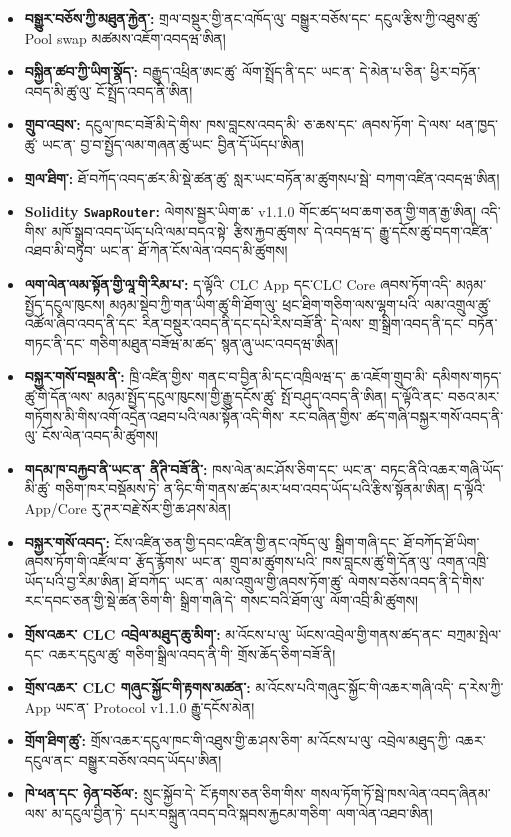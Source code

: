 \documentclass[11pt]{article}
\begin{document}
\begin{itemize}[leftmargin=*]
\item \textbf{བསྒྱུར་བཅོས་ཀྱི་མཐུན་རྐྱེན་:} གྲལ་བསྡུར་གྱི་ནང་འཁོད་ལུ་ བསྒྱུར་བཅོས་དང་ དངུལ་རྩིས་ཀྱི་འཐུས་ཚུ་ Pool swap མཚམས་འཇོག་འབདཝ་ཨིན།
\item \textbf{བསྐྱིན་ཚབ་ཀྱི་ཡིག་སྣོད་:} བརྒྱུད་འཕྲིན་ཨང་ཚུ་ ལོག་སྤྲོད་ནི་དང་ ཡང་ན་ དེ་མེན་པ་ཅིན་ ཕྱིར་བཏོན་འབད་མི་ཚུ་ལུ་ ངོ་སྤྲོད་འབད་ནི་ཨིན།
\item \textbf{གྲུབ་འབྲས་:} དངུལ་ཁང་བཟོ་མི་དེ་གིས་ ཁས་བླངས་འབད་མི་ ཅ་ཆས་དང་ ཞབས་ཏོག་ དེ་ལས་ ཕན་ཁྱད་ཚུ་ ཡང་ན་ བྱ་བ་སྤྱོད་ལམ་གཞན་ཚུ་ཡང་ བྱིན་དོ་ཡོདཔ་ཨིན།
\item \textbf{གྲལ་ཐིག་:} ཐོ་བཀོད་འབད་ཚར་མི་སྡེ་ཚན་ཚུ་ སླར་ཡང་བཏོན་མ་ཚུགསཔ་སྦེ་ བཀག་འཛིན་འབདཝ་ཨིན།
\item \textbf{Solidity \texttt{SwapRouter}:} ལེགས་སྦྱར་ཡིག་ཆ་ v1.1.0 གོང་ཚད་ཕབ་ཆག་ཅན་གྱི་གན་རྒྱ་ཨིན། འདི་གིས་ མཁོ་སྒྲུབ་འབད་ཡོད་པའི་ལམ་བདའ་སྟེ་ རྩིས་རྐྱབ་ཚུགས་ དེ་འབདཝ་ད་ རྒྱུ་དངོས་ཚུ་བདག་འཛིན་འཐབ་མི་བཏུབ་ ཡང་ན་ ཐོ་ཀེན་ངོས་ལེན་འབད་མི་ཚུགས།
\item \textbf{ལག་ལེན་ལམ་སྟོན་གྱི་ལཱ་གི་རིམ་པ་:} ད་ལྟོའི་ CLC App དང་CLC Core ཞབས་ཏོག་འདི་ མཉམ་སྤྱོད་དངུལ་ཁུངས། མཉམ་སྡེབ་ཀྱི་གན་ཡིག་ཚུ་གི་ཐོག་ལུ་ ཕྲང་ཐིག་གཅིག་ལས་ལྷག་པའི་ ལམ་འགྲུལ་ཚུ་འཚོལ་ཞིབ་འབད་ནི་དང་ རིན་བསྡུར་འབད་ནི་དང་དཔེ་རིས་བཟོ་ནི་ དེ་ལས་ གྲ་སྒྲིག་འབད་ནི་དང་ བཏོན་གཏང་ནི་དང་ གཅིག་མཐུན་བཟོཝ་མ་ཚད་ སྙན་ཞུ་ཡང་འབདཝ་ཨིན།
\item \textbf{བསྐྱར་གསོ་བསྡམ་ནི་:} ཁྲི་འཛིན་གྱིས་ གནང་བ་བྱིན་མི་དང་འཁྲིལཝ་ད་ ཆ་འཇོག་གྲུབ་མི་ དམིགས་གཏད་ཚུ་གི་དོན་ལས་ མཉམ་སྤྱོད་དངུལ་ཁུངས།་གྱི་རྒྱུ་དངོས་ཚུ་ སྤོ་བཤུད་འབད་ནི་ཨིན། ད་ལྟོའི་ནང་ བཅའ་མར་གཏོགས་མི་གིས་འགོ་འདྲེན་འཐབ་པའི་ལམ་སྟོན་འདི་གིས་ རང་བཞིན་གྱིས་ ཚད་གཞི་བསྐྱར་གསོ་འབད་ནི་ལུ་ ངོས་ལེན་འབད་མི་ཚུགས།
\item \textbf{གདམ་ཁ་བརྐྱབ་ནི་ཡང་ན་ ནིཊི་བཟོ་ནི་:} ཁས་ལེན་མང་ཤོས་ཅིག་དང་ ཡང་ན་ བཏང་ནིའི་འཆར་གཞི་ཡོད་མི་ཚུ་ གཅིག་ཁར་བསྡོམས་ཏེ་ ན་ཧིང་གི་གནས་ཚད་མར་ཕབ་འབད་ཡོད་པའི་རྩིས་སྟོནམ་ཨིན། ད་ལྟོའི་ App/Core རུ་ཊར་བརྗེ་སོར་གྱི་ཆ་ཤས་མེན།
\item \textbf{བསྐྱར་གསོ་འབད་:} ངོས་འཛིན་ཅན་གྱི་དབང་འཛིན་གྱི་ནང་འཁོད་ལུ་ སྒྲིག་གཞི་དང་ ཐོ་བཀོད་ཐོ་ཡིག་ ཞབས་ཏོག་གི་འཛོལ་བ་ རྩོད་རྙོགས་ ཡང་ན་ གྲུབ་མ་ཚུགས་པའི་ ཁས་བླངས་ཚུ་གི་དོན་ལུ་ འགན་འཁྲི་ཡོད་པའི་བྱ་རིམ་ཨིན། ཐོ་བཀོད་ ཡང་ན་ ལམ་འགྲུལ་གྱི་ཞབས་ཏོག་ཚུ་ ལེགས་བཅོས་འབད་ནི་དེ་གིས་ རང་དབང་ཅན་གྱི་སྡེ་ཚན་ཅིག་གི་ སྒྲིག་གཞི་དེ་ གསང་བའི་ཐོག་ལུ་ ལོག་འབྲི་མི་ཚུགས།
\item \textbf{གྲོས་འཆར་ CLC འབྲེལ་མཐུད་ཆུ་མིག་:} མ་འོངས་པ་ལུ་ ཡོངས་འབྲེལ་གྱི་གནས་ཚད་ནང་ བཀྲམ་སྤེལ་དང་ འཆར་དངུལ་ཚུ་ གཅིག་སྒྲིལ་འབད་ནི་གི་ གྲོས་ཆོད་ཅིག་བཟོ་ནི།
\item \textbf{གྲོས་འཆར་ CLC གཞུང་སྐྱོང་གི་རྟགས་མཚན་:} མ་འོངས་པའི་གཞུང་སྐྱོང་གི་འཆར་གཞི་འདི་ ད་རེས་ཀྱི་ App ཡང་ན་ Protocol v1.1.0 རྒྱུ་དངོས་མེན།
\item \textbf{གྲོག་ཐིག་ཚུ་:} གྲོས་འཆར་དངུལ་ཁང་གི་འཐུས་གྱི་ཆ་ཤས་ཅིག་ མ་འོངས་པ་ལུ་ འབྲེལ་མཐུད་ཀྱི་ འཆར་དངུལ་ནང་ བསྒྱུར་བཅོས་འབད་ཡོདཔ་ཨིན།
\item \textbf{ཁེ་ཕན་དང་ ཉེན་བཅོལ་:} སྲུང་སྐྱོབ་དེ་ ངོ་རྟགས་ཅན་ཅིག་གིས་ གསལ་ཏོག་ཏོ་སྦེ་ཁས་ལེན་འབད་ཞིནམ་ལས་ མ་དངུལ་བྱིན་ཏེ་ དཔར་བསྐྲུན་འབད་བའི་སྐབས་རྐྱངམ་གཅིག་ ལག་ལེན་འཐབ་ཨིན།
\end{itemize}
\end{document}
